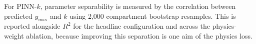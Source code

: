For PINN-$k$, parameter separability is measured by the correlation between predicted $y_{\max}$ and $k$ using 2,000 compartment bootstrap resamples. This is reported alongside $R^2$ for the headline configuration and across the physics-weight ablation, because improving this separation is one aim of the physics loss. %
